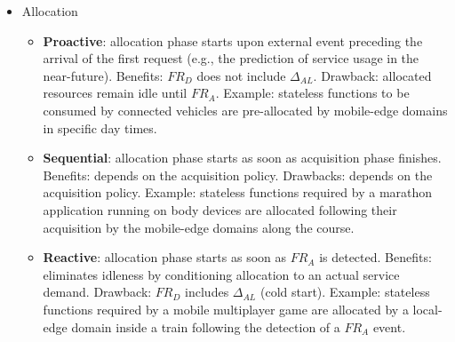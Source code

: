 \begin{itemize}

\item Allocation


\begin{itemize}

\item \textbf{Proactive}: allocation phase starts upon external event preceding the arrival of the first request (e.g., the prediction of service usage in the near-future). Benefits: $FR_D$ does not include $\Delta_{AL}$. Drawback: allocated resources remain idle until $FR_A$. Example: stateless functions to be consumed by connected vehicles are pre-allocated by mobile-edge domains in specific day times.

\item \textbf{Sequential}: allocation phase starts as soon as acquisition phase finishes. Benefits: depends on the acquisition policy. Drawbacks: depends on the acquisition policy. Example: stateless functions required by a marathon application running on body devices are allocated following their acquisition by the mobile-edge domains along the course.

\item \textbf{Reactive}: allocation phase starts as soon as $FR_A$ is detected. Benefits: eliminates idleness by conditioning allocation to an actual service demand. Drawback: $FR_D$ includes $\Delta_{AL}$ (cold start). Example: stateless functions required by a mobile multiplayer game are allocated by a local-edge domain inside a train following the detection of a $FR_A$ event.

\end{itemize}
\end{itemize}


%
%
%
%



